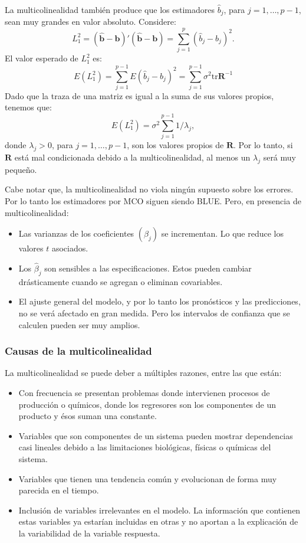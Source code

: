\documentclass[
]{article}
\begin{document}
La multicolinealidad también produce que los estimadores \(\widehat{b}_{j}\), para \(j=1,\ldots,p-1\), sean muy grandes en valor absoluto. Considere:
\[
L_{1}^{2} = (\widehat{\boldsymbol b}- \boldsymbol b)'(\widehat{\boldsymbol b}- \boldsymbol b) = \sum_{j=1}^{p}(\widehat{b}_{j}-b_{j})^{2}.
\]
El valor esperado de \(L_{1}^{2}\) es:
\[
E(L_{1}^{2}) = \sum_{j=1}^{p-1}E(\widehat{b}_{j}-b_{j})^{2} = \sum_{j=1}^{p-1}\sigma^{2}\mbox{tr}\boldsymbol R^{-1}
\]
Dado que la traza de una matriz es igual a la suma de sus valores propios, tenemos que:
\[
E(L_{1}^{2}) = \sigma^{2}\sum_{j=1}^{p-1}1/\lambda_{j},
\]
donde \(\lambda_{j} > 0\), para \(j=1,\ldots,p-1\), son los valores propios de \(\boldsymbol R\). Por lo tanto, si \(\boldsymbol R\) está mal condicionada debido a la multicolinealidad, al menos un \(\lambda_{j}\) será muy pequeño.

Cabe notar que, la multicolinealidad no viola ningún supuesto sobre los errores. Por lo tanto los estimadores por MCO siguen siendo BLUE. Pero, en presencia de multicolinealidad:

\begin{itemize}
\item
  Las varianzas de los coeficientes \((\widehat{\beta}_{j})\) se incrementan. Lo que reduce los valores \(t\) asociados.
\item
  Los \(\widehat{\beta}_{j}\) son sensibles a las especificaciones. Estos pueden cambiar drásticamente cuando se agregan o eliminan covariables.
\item
  El ajuste general del modelo, y por lo tanto los pronósticos y las predicciones, no se verá afectado en gran medida. Pero los intervalos de confianza que se calculen pueden ser muy amplios.
\end{itemize}

\hypertarget{causas-de-la-multicolinealidad}{%
\subsubsection{Causas de la multicolinealidad}\label{causas-de-la-multicolinealidad}}

La multicolinealidad se puede deber a múltiples razones, entre las que están:

\begin{itemize}
\item
  Con frecuencia se presentan problemas donde intervienen procesos de producción o químicos, donde los regresores son los componentes de un producto y ésos suman una constante.
\item
  Variables que son componentes de un sistema pueden mostrar dependencias casi lineales debido a las limitaciones biológicas, físicas o químicas del sistema.
\item
  Variables que tienen una tendencia común y evolucionan de forma muy parecida en el tiempo.
\item
  Inclusión de variables irrelevantes en el modelo. La información que contienen estas variables ya estarían incluidas en otras y no aportan a la explicación de la variabilidad de la variable respuesta.
\end{itemize}
\end{document}
